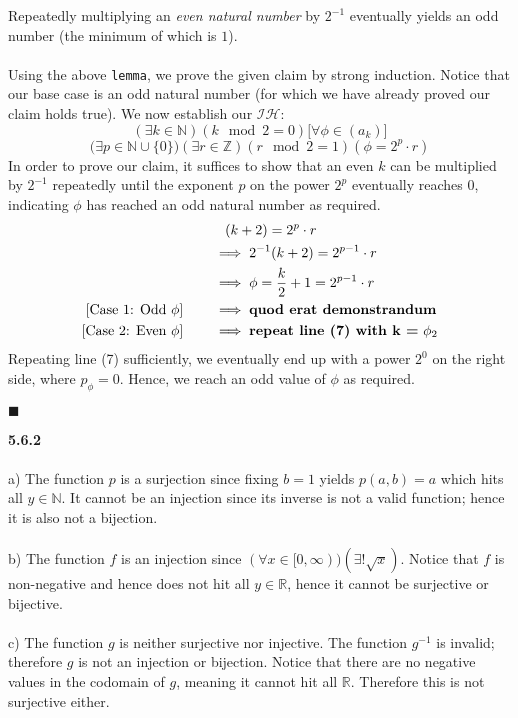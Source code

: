 \documentclass[12pt]{article}
\begin{document}
Repeatedly multiplying an \textit{even natural number} by $2^{-1}$ eventually yields an odd number (the minimum of which is $1$).\\\\ 
Using the above \texttt{lemma}, we prove the given claim by strong induction. Notice that our base case is an odd natural number (for which we have already proved our claim holds true). We now establish our $\mathcal{IH}$:
$$(\exists k \in \mathbb{N})(k \mod 2 = 0)\Big[\forall \phi \in (a_k)\Big]$$
$$\Big(\exists p \in \mathbb{N}\cup \{0\}\Big)(\exists r \in \mathbb{Z})(r \mod 2 = 1)(\phi = 2^p \cdot r)$$
In order to prove our claim, it suffices to show that an even $k$ can be multiplied by $2^{-1}$ repeatedly until the exponent $p$ on the power $2^p$ eventually reaches 0, indicating $\phi$ has reached an odd natural number as required.
\begin{align}
&\quad (k+2) = 2^p \cdot r\\
&\implies 2^{-1}(k+2)=2^{p-1} \cdot r\\
&\implies \phi = \frac{k}{2}+1 = 2^{p-1} \cdot r\\
[\textnormal{Case 1: Odd}\ \phi] \quad\quad &\implies \textbf{quod erat demonstrandum}\\
[\textnormal{Case 2: Even}\ \phi] \quad\quad &\implies \textbf{repeat line (7) with k =}\ \phi_2
\end{align}
Repeating line (7) sufficiently, we eventually end up with a power $2^0$ on the right side, where $p_{\phi} = 0$. Hence, we reach an odd value of $\phi$ as required.
\begin{flushright}
$\blacksquare$
\end{flushright}
\pagebreak
\textbf{5.6.2}\\\\
a) The function $p$ is a surjection since fixing $b=1$ yields $p(a,b)=a$ which hits all $y \in \mathbb{N}$. It cannot be an injection since its inverse is not a valid function; hence it is also not a bijection.\\\\
b) The function $f$ is an injection since $(\forall x \in [0, \infty))(\exists ! \sqrt{x})$. Notice that $f$ is non-negative and hence does not hit all $y \in \mathbb{R}$, hence it cannot be surjective or bijective.\\\\
c) The function $g$ is neither surjective nor injective. The function $g^{-1}$ is invalid; therefore $g$ is not an injection or bijection. Notice that there are no negative values in the codomain of $g$, meaning it cannot hit all $\mathbb{R}$. Therefore this is not surjective either.\\\\
\end{document}
